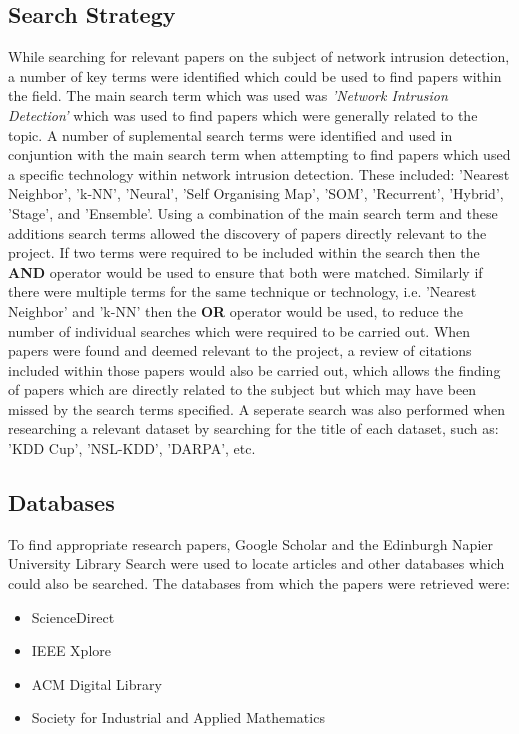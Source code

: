 	\subsection{Search Strategy}
While searching for relevant papers on the subject of network intrusion detection, a number of key terms were identified which could be used to find papers within the field. The main search term which was used was \textit{'Network Intrusion Detection'} which was used to find papers which were generally related to the topic. A number of suplemental search terms were identified and used in conjuntion with the main search term when attempting to find papers which used a specific technology within network intrusion detection. These included: 'Nearest Neighbor', 'k-NN', 'Neural', 'Self Organising Map', 'SOM', 'Recurrent', 'Hybrid', 'Stage', and 'Ensemble'. Using a combination of the main search term and these additions search terms allowed the discovery of papers directly relevant to the project. If two terms were required to be included within the search then the \textbf{AND} operator would be used to ensure that both were matched. Similarly if there were multiple terms for the same technique or technology, i.e. 'Nearest Neighbor' and 'k-NN' then the \textbf{OR} operator would be used, to reduce the number of individual searches which were required to be carried out. When papers were found and deemed relevant to the project, a review of citations included within those papers would also be carried out, which allows the finding of papers which are directly related to the subject but which may have been missed by the search terms specified. A seperate search was also performed when researching a relevant dataset by searching for the title of each dataset, such as: 'KDD Cup', 'NSL-KDD', 'DARPA', etc. 

	\subsection{Databases}
		To find appropriate research papers, Google Scholar and the Edinburgh Napier University Library Search were used to locate articles and other databases which could also be searched. The databases from which the papers were retrieved were:
		\begin{itemize}
			\item ScienceDirect
			\item IEEE Xplore
			\item ACM Digital Library
			\item Society for Industrial and Applied Mathematics
		\end{itemize}
		
